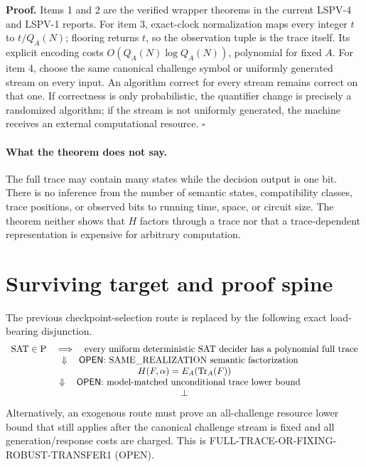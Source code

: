 \documentclass[11pt]{article}
\newcommand{\OPEN}{\textsf{OPEN}}
\begin{document}
\textbf{Proof.}  Items 1 and 2 are the verified wrapper theorems in the current
LSPV-4 and LSPV-1 reports.  For item 3, exact-clock normalization maps every
integer $t$ to $t/Q_A(N)$; flooring returns $t$, so the observation tuple is the
trace itself.  Its explicit encoding costs
$O(Q_A(N)\log Q_A(N))$, polynomial for fixed $A$.  For item 4, choose the same
canonical challenge symbol or uniformly generated stream on every input.  An
algorithm correct for every stream remains correct on that one.  If correctness
is only probabilistic, the quantifier change is precisely a randomized
algorithm; if the stream is not uniformly generated, the machine receives an
external computational resource.  \hfill$\square$

\paragraph{What the theorem does not say.}
The full trace may contain many states while the decision output is one bit.
There is no inference from the number of semantic states, compatibility
classes, trace positions, or observed bits to running time, space, or circuit
size.  The theorem neither shows that $H$ factors through a trace nor that a
trace-dependent representation is expensive for arbitrary computation.

\section*{Surviving target and proof spine}
The previous checkpoint-selection route is replaced by the following exact
load-bearing disjunction.
\[
\begin{array}{c}
 \text{SAT}\in\mathrm P
 \quad\Longrightarrow\quad
 \text{every uniform deterministic SAT decider has a polynomial full trace}
 \\
 \Downarrow\quad\text{\OPEN: SAME\_REALIZATION semantic factorization}\quad\\
 H(F,\alpha)=E_A(\operatorname{Tr}_A(F))
 \\
 \Downarrow\quad\text{\OPEN: model-matched unconditional trace lower bound}\quad\\
 \bot
\end{array}
\]
Alternatively, an exogenous route must prove an all-challenge resource lower
bound that still applies after the canonical challenge stream is fixed and all
generation/response costs are charged.  This is
\textsf{FULL-TRACE-OR-FIXING-ROBUST-TRANSFER1} (\OPEN).
\end{document}

